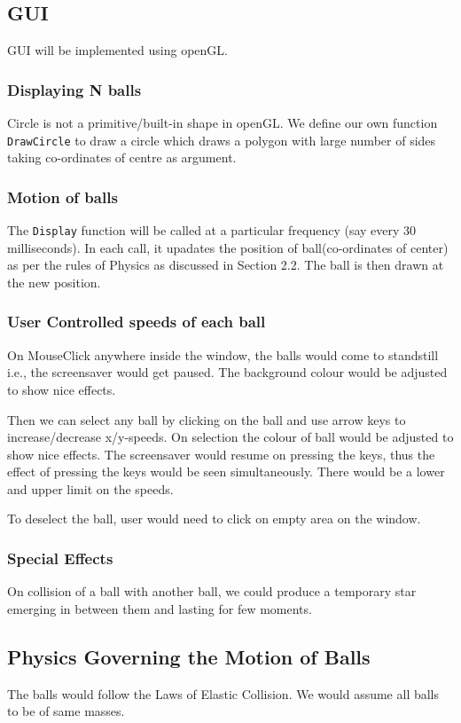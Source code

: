 \documentclass[10pt]{article}
\begin{document}
	\subsection{GUI}
		GUI will be implemented using openGL. 
		\subsubsection{Displaying N balls}
			Circle is not a primitive/built-in shape in openGL. We define our own function \texttt{DrawCircle} to draw a circle which draws a polygon with large number of sides taking co-ordinates of centre as argument.
		\subsubsection{Motion of balls}
			The  \texttt{Display} function will be called at a particular frequency (say every 30 milliseconds). In each call, it upadates the position of ball(co-ordinates of center) as per the rules of Physics as discussed in Section 2.2. The ball is then drawn at the new position. 
		\subsubsection{User Controlled speeds of each ball}
			
			On MouseClick anywhere inside the window, the balls would come to standstill i.e., the screensaver would get paused. The background colour would be adjusted to show nice effects.
			
			Then we can select any ball by clicking on the ball and use arrow keys to increase/decrease x/y-speeds. On selection the colour of ball would be adjusted to show nice effects. The screensaver would resume on pressing the keys, thus the effect of pressing the keys would be seen simultaneously. There would be a lower and upper limit on the speeds. 
			
			To deselect the ball, user would need to click on empty area on the window.
		\subsubsection{Special Effects}
			On collision of a ball with another ball, we could produce a temporary star emerging in between them and lasting for few moments.
	\subsection{Physics Governing the Motion of Balls}
		The balls would follow the Laws of Elastic Collision. We would assume all balls to be of same masses.
\end{document}

